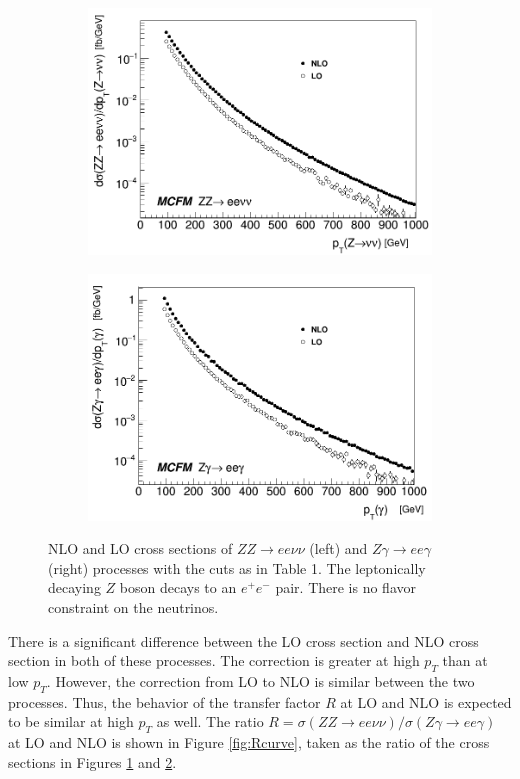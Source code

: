 \documentclass[11pt,a4paper,openright,twoside]{report}
\begin{document}
\begin{figure}[H]
\centering
	\begin{subfigure}{0.49\textwidth}
		\includegraphics[width=\linewidth]{ZZ_xsec.png}
		\caption{}
		\label{subfig:ZeeZvv}
	\end{subfigure}	
	\begin{subfigure}{0.49\textwidth}
		\includegraphics[width=\linewidth]{Zg_xsec.png}
		\caption{}
		\label{subfig:Zeeg}	
	\end{subfigure}
	\caption{NLO and LO cross sections of $ZZ\to ee\nu\nu$ (left) and $Z\gamma\to ee\gamma$ (right) processes with the cuts as in Table 1. The leptonically decaying $Z$ boson decays to an $e^+e^-$ pair. There is no flavor constraint on the neutrinos.}
	\label{fig:xsecs}
\end{figure}
There is a significant difference between the LO cross section and NLO cross section in both of these processes. The correction is greater at high $p_T$ than at low $p_T$. However, the correction from LO to NLO is similar between the two processes. Thus, the behavior of the transfer factor $R$ at LO and NLO is expected to be similar at high $p_T$ as well. The ratio $R = \sigma(ZZ\rightarrow ee\nu\nu)/\sigma(Z\gamma\rightarrow ee\gamma)$ at LO and NLO is shown in Figure \ref{fig:Rcurve}, taken as the ratio of the cross sections in Figures \ref{subfig:ZeeZvv} and \ref{subfig:Zeeg}.
\end{document}
